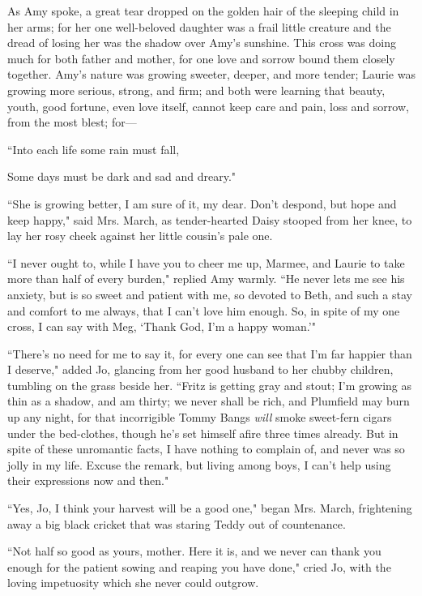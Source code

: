 As Amy spoke, a great tear dropped on the golden hair of the sleeping
child in her arms; for her one well-beloved daughter was a frail little
creature and the dread of losing her was the shadow over
Amy's sunshine. This cross was doing much for both
father and mother, for one love and sorrow bound them closely together.
Amy's nature was growing sweeter, deeper, and more
tender; Laurie was growing more serious, strong, and firm; and both were
learning that beauty, youth, good fortune, even love itself, cannot keep
care and pain, loss and sorrow, from the most blest; for---

``Into each life some rain must fall,

Some days must be dark and sad and dreary."

``She is growing better, I am sure of it, my dear. Don't
despond, but hope and keep happy," said Mrs. March, as tender-hearted
Daisy stooped from her knee, to lay her rosy cheek against her little
cousin's pale one.

``I never ought to, while I have you to cheer me up, Marmee, and Laurie
to take more than half of every burden," replied Amy warmly. ``He never
lets me see his anxiety, but is so sweet and patient with me, so devoted
to Beth, and such a stay and comfort to me always, that I
can't love him enough. So, in spite of my one cross, I
can say with Meg, `Thank God, I'm a
happy woman.'"

``There's no need for me to say it, for every one can see
that I'm far happier than I deserve," added Jo, glancing
from her good husband to her chubby children, tumbling on the grass
beside her. ``Fritz is getting gray and stout; I'm
growing as thin as a shadow, and am thirty; we never shall be rich, and
Plumfield may burn up any night, for that incorrigible Tommy Bangs
\emph{will} smoke sweet-fern cigars under the bed-clothes, though
he's set himself afire three times already. But in spite
of these unromantic facts, I have nothing to complain of, and never was
so jolly in my life. Excuse the remark, but living among boys, I
can't help using their expressions now and then."

``Yes, Jo, I think your harvest will be a good one," began Mrs. March,
frightening away a big black cricket that was staring Teddy out of
countenance.

``Not half so good as yours, mother. Here it is, and we never can thank
you enough for the patient sowing and reaping you have done," cried Jo,
with the loving impetuosity which she never could outgrow.

